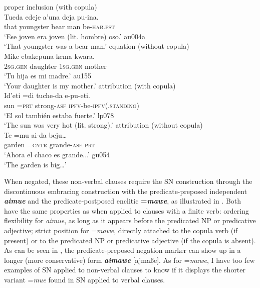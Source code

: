 \documentclass[output=paper,draft,draftmode,colorlinks,citecolor=brown]{langscibook}
\begin{document}
\largerpage
\begin{exe}\ex\label{ex:tacana-bearman-mother}
\begin{xlist}
\ex\label{ex:tacana-bearman} 
proper inclusion (with copula)\\
\gll {}Tueda edeje{\cb} a'una deja{\cb} pu-ina.\\
    that  youngster  bear  man  be-\textsc{hab.pst}\\
\glt`Ese joven era joven (lit. hombre) oso.' au004a\\
`That youngster was a bear-man.'
\ex\label{ex:tacana-mother} 
 equation (without copula)\\
\gll {}Mike ebakepuna{\cb} kema kwara{\cb}.\\
 \textsc{2sg.gen}  daughter  \textsc{1sg.gen}  mother\\
\glt `Tu hija es mi madre.' au155\\
`Your daughter is my mother.'
\ex\label{ex:tacana-veryhot}
 attribution (with copula)\\
\gll {}Id'eti  =di tuche-da e-pu-eti.\\
    sun  =\textsc{prt}  strong-\textsc{asf}
    \textsc{ipfv}-be-\textsc{ipfv(.standing)}\\
\glt `El sol también estaba fuerte.' lp078\\
`The sun was very hot (lit. strong).' 
\ex\label{ex:tacana-garden}
 attribution (without copula)\\
\gll {}Te  =mu ai-da  beju…\\
    garden  =\textsc{cntr}  grande-\textsc{asf}  \textsc{prt}\\
\glt `Ahora el chaco es grande...' gu054\\
`The garden is big…' 
\end{xlist}\end{exe}

When negated, these non-verbal clauses require the SN construction through
the discontinuous embracing construction with the predicate-preposed
independent \textbf{\textit{aimue}} and the predicate-postposed enclitic
\textbf{=\textit{mawe}}, as illustrated in .
Both have the same properties as when applied to clauses with a finite
verb: ordering flexibility for \textit{aimue}, as long as it appears before
the predicated NP or predicative adjective; strict position for
=\textit{mawe}, directly attached to the copula verb (if present) or to the
predicated NP or predicative adjective (if the copula is absent). As can be
seen in , the predicate-preposed negation marker can show up in a longer (more conservative) form \textbf{\textit{aimawe}} [ajma\d{ß}e]. As for =\textit{mawe}, I have too few examples of SN applied to non-verbal clauses to know if it displays the shorter variant =\textit{mue} found in SN applied to verbal clauses.
\end{document}
